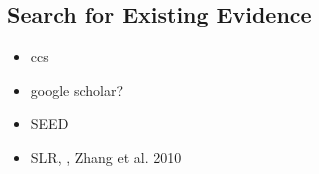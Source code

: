 \subsection{Search for Existing Evidence}
\label{subsec:search for existing evidence}

\begin{itemize}
	\item ccs
	\item google scholar?
	\item SEED
	\item SLR, , Zhang et al. 2010
\end{itemize}